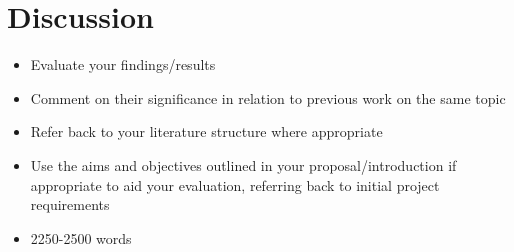 \section{Discussion}

\begin{itemize}
    \item Evaluate your findings/results
    \item Comment on their significance in relation to previous work on the same topic
    \item Refer back to your literature structure where appropriate
    \item Use the aims and objectives outlined in your proposal/introduction if appropriate to aid your evaluation, referring back to initial project requirements
    \item 2250-2500 words
\end{itemize}

